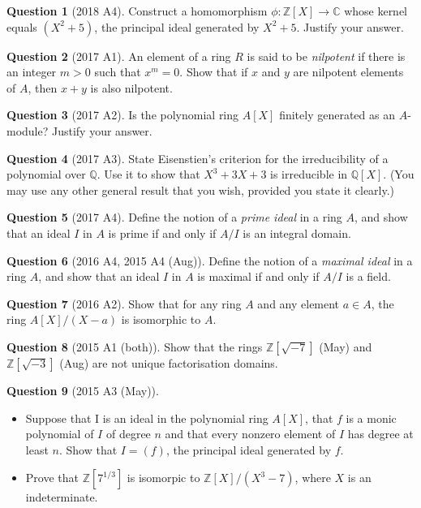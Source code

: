 \documentclass{article}
\numberwithin{equation}{section}
\theoremstyle{definition}
\newtheorem{quest}{Question}
\newcommand{\Z}{\mathbb{Z}}
\newcommand{\Q}{\mathbb{Q}}
\newcommand{\C}{\mathbb{C}}
\renewcommand{\.}{\,.}
\begin{document}
\begin{quest}[2018 A4]
Construct a homomorphism $\phi:\Z[X]\to\C$ whose kernel equals $(X^2+5)$, the principal ideal generated by $X^2+5$. Justify your answer.
\end{quest}

\begin{quest}[2017 A1]
An element of a ring $R$ is said to be \textit{nilpotent} if there is an integer $m>0$ such that $x^m=0$. Show that if $x$ and $y$ are nilpotent elements of $A$, then $x+y$ is also nilpotent.
\end{quest}

\begin{quest}[2017 A2]
Is the polynomial ring $A[X]$ finitely generated as an $A$-module? Justify your answer.
\end{quest}

\begin{quest}[2017 A3]
State Eisenstien's criterion for the irreducibility of a polynomial over $\Q$. Use it to show that $X^3+3X+3$ is irreducible in $\Q[X]$. (You may use any other general result that you wish, provided you state it clearly.)
\end{quest}

\begin{quest}[2017 A4]
Define the notion of a \textit{prime ideal} in a ring $A$, and show that an ideal $I$ in $A$ is prime if and only if $A/I$ is an integral domain.
\end{quest}

\begin{quest}[2016 A4, 2015 A4 (Aug)]
Define the notion of a \textit{maximal ideal} in a ring $A$, and show that an ideal $I$ in $A$ is maximal if and only if $A/I$ is a field.
\end{quest}

\begin{quest}[2016 A2]
Show that for any ring $A$ and any element $a\in A$, the ring $A[X]/(X-a)$ is isomorphic to $A$.
\end{quest}

\begin{quest}[2015 A1 (both)]
Show that the rings $\Z[\sqrt{-7}]$ (May) and $\Z[\sqrt{-3}]$ (Aug) are not unique factorisation domains.
\end{quest}

\begin{quest}[2015 A3 (May)]
\begin{itemize}
\item Suppose that I is an ideal in the polynomial ring $A[X]$, that $f$ is a monic polynomial of $I$ of degree $n$ and that every nonzero element of $I$ has degree at least $n$. Show that $I=(f)$, the principal ideal generated by $f$.
\item Prove that $\Z[7^{1/3}]$ is isomorpic to $\Z[X]/(X^3-7)$, where $X$ is an indeterminate.
\end{itemize}
\end{quest}
\end{document}
